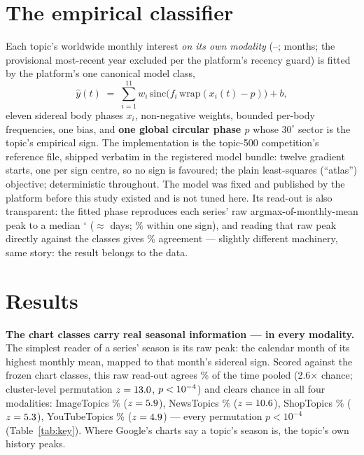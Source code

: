 \documentclass[11pt]{artaquest}
\begin{document}
\section{The empirical classifier}
Each topic's worldwide monthly interest \emph{on its own modality} (\winStart{}--\winEnd{}; \nMonths{} months; the provisional most-recent year excluded per the platform's recency guard) is fitted by the platform's one canonical model class,
\[ \hat{y}(t) \;=\; \sum_{i=1}^{11} w_i\,\mathrm{sinc}\!\big(f_i\,\mathrm{wrap}(x_i(t) - p)\big) + b, \]
eleven sidereal body phases $x_i$, non-negative weights, bounded per-body frequencies, one bias, and \textbf{one global circular phase $p$} whose $30^\circ$ sector is the topic's empirical sign. The implementation is the topic-500 competition's reference file, shipped verbatim in the registered model bundle: twelve gradient starts, one per sign centre, so no sign is favoured; the plain least-squares (``atlas'') objective; deterministic throughout. The model was fixed and published by the platform before this study existed and is not tuned here. Its read-out is also transparent: the fitted phase reproduces each series' raw argmax-of-monthly-mean peak to a median \rawMedianDeg$^\circ$ ($\approx$\rawMedianDays{} days; \rawWithinSign\% within one sign), and reading that raw peak directly against the classes gives \rawAgree\% agreement --- slightly different machinery, same story: the result belongs to the data.

\section{Results}
\textbf{The chart classes carry real seasonal information --- in every modality.} The simplest reader of a series' season is its raw peak: the calendar month of its highest monthly mean, mapped to that month's sidereal sign. Scored against the frozen chart classes, this raw read-out agrees \rawAgree\% of the time pooled (2.6$\times$ chance; cluster-level permutation $z = 13.0$, $p < 10^{-4}$) and clears chance in all four modalities: ImageTopics \rawAgreeImage\% ($z=5.9$), NewsTopics \rawAgreeNews\% ($z=10.6$), ShopTopics \rawAgreeShop\% ($z=5.3$), YouTubeTopics \rawAgreeYouTube\% ($z=4.9$) --- every permutation $p < 10^{-4}$ (Table~\ref{tab:key}). Where Google's charts say a topic's season is, the topic's own history peaks.
\end{document}
